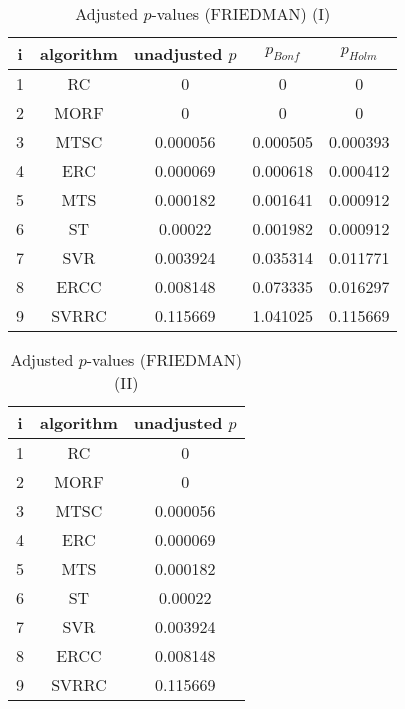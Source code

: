 \documentclass[a4paper,10pt]{article}
\begin{document}
\begin{landscape}
\begin{table}[!htp]
\centering\small
\begin{tabular}{ccccc}
i&algorithm&unadjusted $p$&$p_{Bonf}$&$p_{Holm}$\\
\hline1&RC&0&0&0\\2&MORF&0&0&0\\3&MTSC&0.000056&0.000505&0.000393\\4&ERC&0.000069&0.000618&0.000412\\5&MTS&0.000182&0.001641&0.000912\\6&ST&0.00022&0.001982&0.000912\\7&SVR&0.003924&0.035314&0.011771\\8&ERCC&0.008148&0.073335&0.016297\\9&SVRRC&0.115669&1.041025&0.115669\\\hline
\end{tabular}
\caption{Adjusted $p$-values (FRIEDMAN) (I)}
\end{table}
\begin{table}[!htp]
\centering\small
\begin{tabular}{ccc}
i&algorithm&unadjusted $p$\\
\hline1&RC&0\\2&MORF&0\\3&MTSC&0.000056\\4&ERC&0.000069\\5&MTS&0.000182\\6&ST&0.00022\\7&SVR&0.003924\\8&ERCC&0.008148\\9&SVRRC&0.115669\\\hline
\end{tabular}
\caption{Adjusted $p$-values (FRIEDMAN) (II)}
\end{table}

\newpage
\end{landscape}
\end{document}
